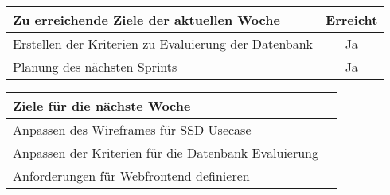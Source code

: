 \begin{tabularx}{\textwidth}{Xc}
    \arrayrulecolor{OliveGreen}
    \toprule
    {\bfseries Zu erreichende Ziele der aktuellen Woche} & {\bfseries Erreicht} \\
    \midrule[2pt]
    Erstellen der Kriterien zu Evaluierung der Datenbank  &Ja                    \\
    \rowcolor{OliveGreen!15}
    Planung des nächsten Sprints                          &Ja                    \\
     \bottomrule[2pt]
\end{tabularx}
%
\vspace{1cm}
%
\begin{tabularx}{\textwidth}{Xc}
    \arrayrulecolor{OliveGreen}
    \toprule
    {\bfseries Ziele für die nächste Woche}              &                      \\
    \midrule[2pt]
    Anpassen des Wireframes für SSD Usecase              &                      \\
    \rowcolor{OliveGreen!15}
    Anpassen der Kriterien für die Datenbank Evaluierung &                      \\
    \rowcolor{OliveGreen!15}
    Anforderungen für Webfrontend definieren             &                      \\
\end{tabularx}
